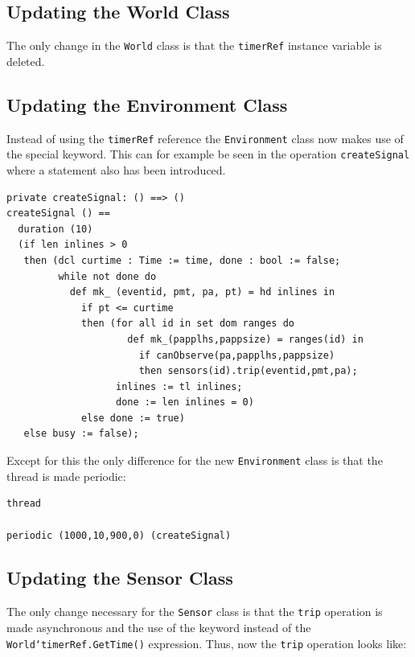 \documentclass{overturerepchap}
\begin{document}
\subsection{Updating the World Class}

The only change in the \texttt{World} class is that the \texttt{timerRef}
instance variable is deleted.

\subsection{Updating the Environment Class}

Instead of using the \texttt{timerRef} reference the
\texttt{Environment} class now makes use of the special {\bf{}}
keyword. This can for example be seen in the operation
\texttt{createSignal} where a {\bf{}} statement also has
been introduced.

\begin{lstlisting}
private createSignal: () ==> ()
createSignal () ==
  duration (10) 
  (if len inlines > 0
   then (dcl curtime : Time := time, done : bool := false;
         while not done do
           def mk_ (eventid, pmt, pa, pt) = hd inlines in
             if pt <= curtime
             then (for all id in set dom ranges do
                     def mk_(papplhs,pappsize) = ranges(id) in
                       if canObserve(pa,papplhs,pappsize)
                       then sensors(id).trip(eventid,pmt,pa);
                   inlines := tl inlines;
                   done := len inlines = 0)
             else done := true)
   else busy := false);
\end{lstlisting}

Except for this the only difference for the new \texttt{Environment} class
is that the thread is made periodic:

\begin{lstlisting}
thread

periodic (1000,10,900,0) (createSignal)
\end{lstlisting}

\subsection{Updating the Sensor Class}

The only change necessary for the \texttt{Sensor} class is that the 
\texttt{trip} operation is made asynchronous and the use of the 
{\bf{}} keyword instead of the \texttt{World`timerRef.GetTime()} 
expression. Thus, now the \texttt{trip} operation looks like:
\end{document}
